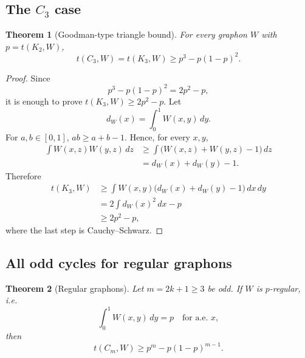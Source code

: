 \documentclass[11pt]{article}
\newtheorem{theorem}{Theorem}[section]
\begin{document}
\subsection{The $C_3$ case}

\begin{theorem}[Goodman-type triangle bound]\label{thm:C3}
For every graphon $W$ with $p=t(K_2,W)$,
\[
        t(C_3,W)=t(K_3,W)\ge p^3-p(1-p)^2.
\]
\end{theorem}

\begin{proof}
Since
\[
        p^3-p(1-p)^2=2p^2-p,
\]
it is enough to prove $t(K_3,W)\ge 2p^2-p$.
Let
\[
        d_W(x)=\int_0^1 W(x,y)\,dy.
\]
For $a,b\in[0,1]$, $ab\ge a+b-1$.  Hence, for every $x,y$,
\[
\begin{aligned}
    \int W(x,z)W(y,z)\,dz
    &\ge \int\bigl(W(x,z)+W(y,z)-1\bigr)\,dz\\
    &=d_W(x)+d_W(y)-1.
\end{aligned}
\]
Therefore
\[
\begin{aligned}
    t(K_3,W)
    &\ge \int W(x,y)\bigl(d_W(x)+d_W(y)-1\bigr)\,dx\,dy\\
    &=2\int d_W(x)^2\,dx-p\\
    &\ge 2p^2-p,
\end{aligned}
\]
where the last step is Cauchy--Schwarz.
\end{proof}

\subsection{All odd cycles for regular graphons}\label{subsec:regular}

\begin{theorem}[Regular graphons]\label{thm:regular}
Let $m=2k+1\ge3$ be odd.  If $W$ is $p$-regular, i.e.
\[
        \int_0^1 W(x,y)\,dy=p\quad\text{for a.e. }x,
\]
then
\[
        t(C_m,W)\ge p^m-p(1-p)^{m-1}.
\]
\end{theorem}
\end{document}
